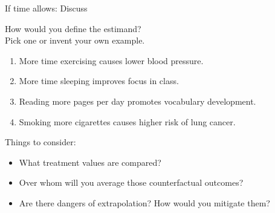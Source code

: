 \documentclass{beamer}
\begin{document}
\begin{frame}{If time allows: Discuss}

How would you define the estimand?\\Pick one or invent your own example.
\begin{enumerate}
\item More time exercising causes lower blood pressure.
\item More time sleeping improves focus in class.
\item Reading more pages per day promotes vocabulary development.
\item Smoking more cigarettes causes higher risk of lung cancer.
\end{enumerate}
Things to consider:
\begin{itemize}
\item What treatment values are compared?
\item Over whom will you average those counterfactual outcomes?
\item Are there dangers of extrapolation? How would you mitigate them?
\end{itemize}

\end{frame}
\end{document}
